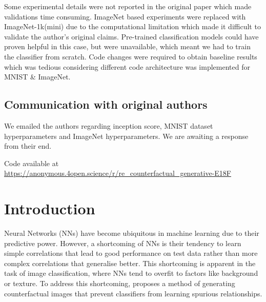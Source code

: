 Some experimental details were not reported in the original paper which made validations time consuming. ImageNet based experiments were replaced with ImageNet-1k(mini) due to the computational limitation which made it difficult to validate the author's original claims. Pre-trained classification models could have proven helpful in this case, but were unavailable, which meant we had to train the classifier from scratch. Code changes were required to obtain baseline results which was tedious considering different code architecture was implemented for MNIST \& ImageNet.

\subsection*{Communication with original authors}
We emailed the authors regarding inception score, MNIST dataset hyperparameters and ImageNet hyperparameters. We are awaiting a response from their end. 

Code available at \url{https://anonymous.4open.science/r/re_counterfactual_generative-E18F}
\newpage





\section{Introduction}

Neural Networks (NNs) have become ubiquitous in machine learning due to their predictive power. However, a shortcoming of NNs is their tendency to learn simple correlations that lead to good performance on test data rather than more complex correlations that generalise better. This shortcoming is apparent in the task of image classification, where NNs tend to overfit to factors like background or texture. To address this shortcoming, \citep{sauer2021counterfactual} proposes a method of generating counterfactual images that prevent classifiers from learning spurious relationships.

